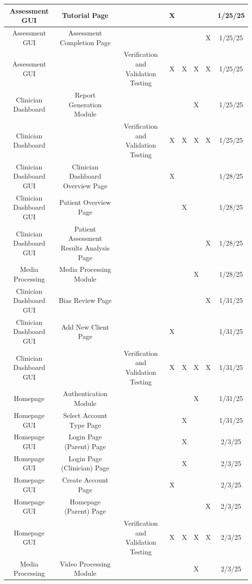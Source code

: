 \documentclass[12pt, titlepage]{article}
\begin{document}
\begin{landscape}
\begin{longtable}{|c|c|c|c|c|c|c|c|}
      Assessment GUI & Tutorial Page & ~ & X & ~ & ~ & ~ & 1/25/25 \\ \hline
      Assessment GUI & Assessment Completion Page & ~ & ~ & ~ & ~ & X & 1/25/25 \\ \hline
      Assessment GUI & ~ & Verification and Validation Testing & X & X & X & X & 1/25/25 \\ \hline
      Clinician Dashboard & Report Generation Module & ~ & ~ & ~ & X & ~ & 1/25/25 \\ \hline
      Clinician Dashboard & ~ & Verification and Validation Testing & X & X & X & X & 1/25/25 \\ \hline
      Clinician Dashboard GUI & Clinician Dashboard Overview Page & ~ & X & ~ & ~ & ~ & 1/28/25 \\ \hline
      Clinician Dashboard GUI & Patient Overview Page & ~ & ~ & X & ~ & ~ & 1/28/25 \\ \hline
      Clinician Dashboard GUI & Patient Assessment Results Analysis Page & ~ & ~ & ~ & ~ & X & 1/28/25 \\ \hline
      Media Processing & Media Processing Module & ~ & ~ & ~ & X & ~ & 1/28/25 \\ \hline
      Clinician Dashboard GUI & Bias Review Page & ~ & ~ & ~ & ~ & X & 1/31/25 \\ \hline
      Clinician Dashboard GUI & Add New Client Page & ~ & X & ~ & ~ & ~ & 1/31/25 \\ \hline
      Clinician Dashboard GUI & ~ & Verification and Validation Testing & X & X & X & X & 1/31/25 \\ \hline
      Homepage & Authentication Module & ~ & ~ & ~ & X & ~ & 1/31/25 \\ \hline
      Homepage GUI & Select Account Type Page & ~ & ~ & X & ~ & ~ & 1/31/25 \\ \hline
      Homepage GUI & Login Page (Parent) Page & ~ & ~ & X & ~ & ~ & 2/3/25 \\ \hline
      Homepage GUI & Login Page (Clinician) Page & ~ & ~ & X & ~ & ~ & 2/3/25 \\ \hline
      Homepage GUI & Create Account Page & ~ & X & ~ & ~ & ~ & 2/3/25 \\ \hline
      Homepage GUI & Homepage (Parent) Page & ~ & ~ & ~ & ~ & X & 2/3/25 \\ \hline
      Homepage GUI & ~ & Verification and Validation Testing & X & X & X & X & 2/3/25 \\ \hline
      Media Processing & Video Processing Module & ~ & ~ & ~ & X & ~ & 2/3/25 \\ \hline

\end{longtable}
\end{landscape}
\end{document}
